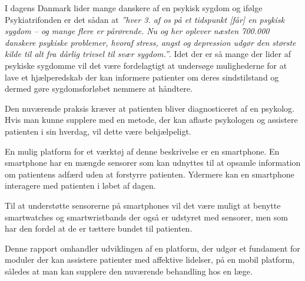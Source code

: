 


I dagens Danmark lider mange danskere af en psykisk sygdom og ifølge Psykiatrifonden er det sådan at \textit{''hver 3. af os på et tidspunkt [får] en psykisk sygdom – og mange flere er pårørende. 
Nu og her oplever næsten 700.000 danskere psykiske problemer, hvoraf stress, angst og depression udgør den største kilde til alt fra dårlig trivsel til svær sygdom.''}\citep{psykiatrifonden}.
Idet der er så mange der lider af psykiske sygdomme vil det være fordelagtigt at undersøge mulighederne for at lave et hjælperedskab der kan informere patienter om deres sindstilstand og dermed gøre sygdomsforløbet nemmere at håndtere.

Den nuværende praksis kræver at patienten bliver diagnosticeret af en psykolog.
Hvis man kunne supplere med en metode, der kan aflaste psykologen og assistere patienten i sin hverdag, vil dette være behjælpeligt. 

En mulig platform for et værktøj af denne beskrivelse er en smartphone.
En smartphone har en mængde sensorer som kan udnyttes til at opsamle information om patientens adfærd uden at forstyrre patienten.
Ydermere kan en smartphone interagere med patienten i løbet af dagen. 

Til at understøtte sensorerne på smartphones vil det være muligt at benytte smartwatches og smartwristbands der også er udstyret med sensorer, men som har den fordel at de er tættere bundet til patienten.

Denne rapport omhandler udviklingen af en platform, der udgør et fundament for moduler der kan assistere patienter med affektive lidelser, på en mobil platform, således at man kan supplere den nuværende behandling hos en læge.